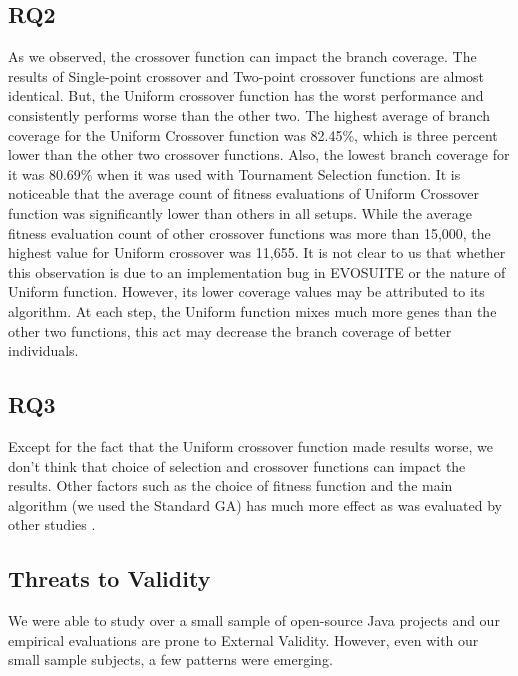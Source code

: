 \documentclass[sigconf]{acmart}
\begin{document}
\subsection{RQ2}
As we observed, the crossover function can impact the branch coverage. The results of Single-point crossover 
and Two-point crossover functions are almost identical. But, the Uniform
crossover function has the worst performance and consistently performs worse than the other two. The highest
average of branch coverage for the Uniform Crossover function was 82.45\%, which is three percent lower than the other two 
crossover functions. Also, the lowest branch coverage for it was 80.69\% when it was used with Tournament Selection
function. It is noticeable that the average count of fitness evaluations of Uniform Crossover function was 
significantly lower than others in all setups. While the average fitness evaluation count of other crossover 
functions was more than 15,000, the highest value for Uniform crossover was 11,655. It is not clear to us that 
whether this observation is due to an implementation bug in EVOSUITE or the nature of Uniform function. 
However, its lower coverage values may be attributed to its algorithm. At each step, the Uniform function mixes 
much more genes than the other two functions, this act may decrease the branch coverage of better individuals.

\subsection{RQ3}
Except for the fact that the Uniform crossover function made results worse, we don't think that choice of 
selection and crossover functions can impact the results. Other factors such as the choice of fitness function and 
the main algorithm (we used the Standard GA) has much more effect as was evaluated by other studies 
\cite{CAMPOS2018207}.

\subsection{Threats to Validity}
We were able to study over a small sample of open-source Java projects and our empirical evaluations are prone 
to External Validity. However, even with our small sample subjects, a few patterns were emerging. 
\end{document}
